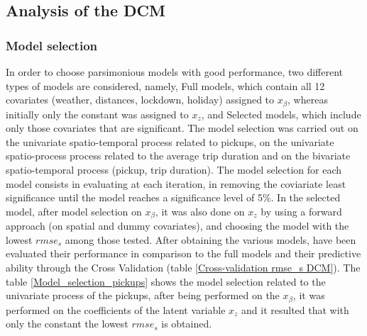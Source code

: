 \subsection{Analysis of the DCM}

\subsubsection{Model selection}
In order to choose  parsimonious models with good performance, two different types of models are considered, namely, Full models, which contain all \num{12} covariates (weather, distances, lockdown, holiday) assigned to $x_{\beta}$, whereas initially only the constant was assigned to $x_{z}$, and Selected models, which include only those covariates that are significant.
The model selection was carried out on the univariate spatio-temporal process related to pickups, on the univariate spatio-process process related to the average trip duration and on the bivariate spatio-temporal process (pickup, trip duration). 
The model selection for each model consists in evaluating at each iteration, in removing the coviariate least significance until the model reaches a significance level of \num{5}\%. 
In the selected model, after model selection on $x_{\beta}$, it was also done on $x_{z}$ by using a forward approach (on spatial and dummy covariates), and choosing the model with the lowest $rmse_{s}$ among those tested.
After obtaining the various models, have been evaluated their performance in comparison to the full models and their predictive ability through the Cross Validation (table \ref{Cross-validation rmse_s DCM}). 
The table \ref{Model_selection_pickups} shows the model selection related to the univariate process of the pickups,  after being performed on the $x_{\beta}$, it was performed on the coefficients of the latent variable $x_{z}$ and it resulted that with only the constant the lowest  $rmse_{s}$  is obtained.




